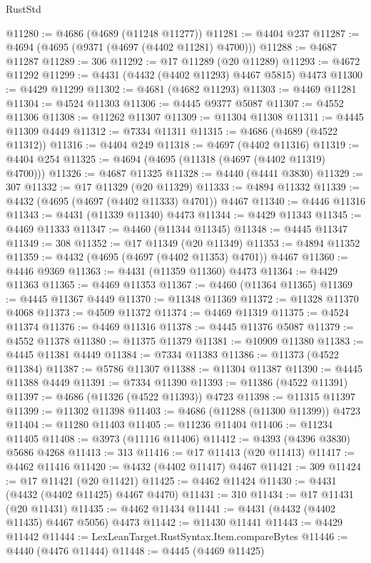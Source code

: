 \begin{lexlean}{RustStd}
\begin{coremodule}
@11280 := @4686 (@4689 (@11248 @11277))
@11281 := @4404 @237
@11287 := @4694 (@4695 (@9371 (@4697 (@4402 @11281) @4700)))
@11288 := @4687 @11287
@11289 := 306
@11292 := @17 @11289 (@20 @11289)
@11293 := @4672 @11292
@11299 := @4431 (@4432 (@4402 @11293) @4467 @5815) @4473
@11300 := @4429 @11299
@11302 := @4681 (@4682 @11293)
@11303 := @4469 @11281
@11304 := @4524 @11303
@11306 := @4445 @9377 @5087
@11307 := @4552 @11306
@11308 := @11262 @11307
@11309 := @11304 @11308
@11311 := @4445 @11309 @4449
@11312 := @7334 @11311
@11315 := @4686 (@4689 (@4522 @11312))
@11316 := @4404 @249
@11318 := @4697 (@4402 @11316)
@11319 := @4404 @254
@11325 := @4694 (@4695 (@11318 (@4697 (@4402 @11319) @4700)))
@11326 := @4687 @11325
@11328 := @4440 (@4441 @3830)
@11329 := 307
@11332 := @17 @11329 (@20 @11329)
@11333 := @4894 @11332
@11339 := @4432 (@4695 (@4697 (@4402 @11333) @4701)) @4467
@11340 := @4446 @11316
@11343 := @4431 (@11339 @11340) @4473
@11344 := @4429 @11343
@11345 := @4469 @11333
@11347 := @4460 (@11344 @11345)
@11348 := @4445 @11347
@11349 := 308
@11352 := @17 @11349 (@20 @11349)
@11353 := @4894 @11352
@11359 := @4432 (@4695 (@4697 (@4402 @11353) @4701)) @4467
@11360 := @4446 @9369
@11363 := @4431 (@11359 @11360) @4473
@11364 := @4429 @11363
@11365 := @4469 @11353
@11367 := @4460 (@11364 @11365)
@11369 := @4445 @11367 @4449
@11370 := @11348 @11369
@11372 := @11328 @11370 @4068
@11373 := @4509 @11372
@11374 := @4469 @11319
@11375 := @4524 @11374
@11376 := @4469 @11316
@11378 := @4445 @11376 @5087
@11379 := @4552 @11378
@11380 := @11375 @11379
@11381 := @10909 @11380
@11383 := @4445 @11381 @4449
@11384 := @7334 @11383
@11386 := @11373 (@4522 @11384)
@11387 := @5786 @11307
@11388 := @11304 @11387
@11390 := @4445 @11388 @4449
@11391 := @7334 @11390
@11393 := @11386 (@4522 @11391)
@11397 := @4686 (@11326 (@4522 @11393)) @4723
@11398 := @11315 @11397
@11399 := @11302 @11398
@11403 := @4686 (@11288 (@11300 @11399)) @4723
@11404 := @11280 @11403
@11405 := @11236 @11404
@11406 := @11234 @11405
@11408 := @3973 (@11116 @11406)
@11412 := @4393 (@4396 @3830) @5686 @4268
@11413 := 313
@11416 := @17 @11413 (@20 @11413)
@11417 := @4462 @11416
@11420 := @4432 (@4402 @11417) @4467
@11421 := 309
@11424 := @17 @11421 (@20 @11421)
@11425 := @4462 @11424
@11430 := @4431 (@4432 (@4402 @11425) @4467 @4470)
@11431 := 310
@11434 := @17 @11431 (@20 @11431)
@11435 := @4462 @11434
@11441 := @4431 (@4432 (@4402 @11435) @4467 @5056) @4473
@11442 := @11430 @11441
@11443 := @4429 @11442
@11444 := LexLeanTarget.RustSyntax.Item.compareBytes
@11446 := @4440 (@4476 @11444)
@11448 := @4445 (@4469 @11425)

\end{coremodule}
\end{lexlean}
